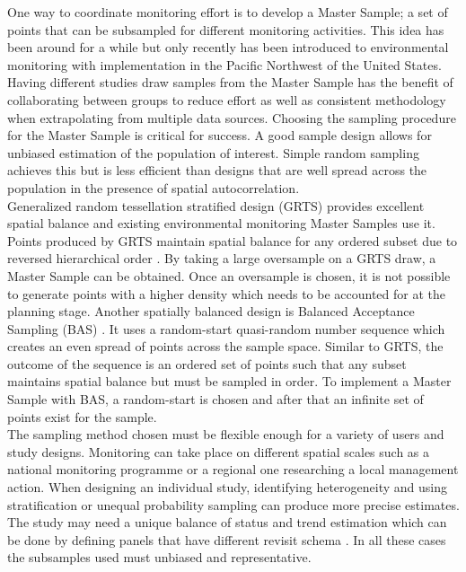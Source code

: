 \documentclass[]{article}
\begin{document}
One way to coordinate monitoring effort is to develop a Master Sample; a set of points that can be subsampled for different monitoring activities. This idea has been around for a while \cite{King1945} but only recently has been introduced to environmental monitoring \cite{LarsenOlsenStevens2008} with implementation in the Pacific Northwest of the United States. Having different studies draw samples from the Master Sample has the benefit of collaborating between groups to reduce effort as well as consistent methodology when extrapolating from multiple data sources. Choosing the sampling procedure for the Master Sample is critical for success. A good sample design allows for unbiased estimation of the population of interest. Simple random sampling achieves this but is less efficient than designs that are well spread across the population in the presence of spatial autocorrelation.\\

Generalized random tessellation stratified design (GRTS) \cite{StevensOlsen2004} provides excellent spatial balance and existing environmental monitoring Master Samples \cite{LarsenOlsenStevens2008} use it. Points produced by GRTS maintain spatial balance for any ordered subset due to reversed hierarchical order \cite{StevensOlsen2004}. By taking a large oversample on a GRTS draw, a Master Sample can be obtained. Once an oversample is chosen, it is not possible to generate points with a higher density which needs to be accounted for at the planning stage. Another spatially balanced design is Balanced Acceptance Sampling (BAS) \cite{Robertson2013}. It uses a random-start quasi-random number sequence which creates an even spread of points across the sample space. Similar to GRTS, the outcome of the sequence is an ordered set of points such that any subset maintains spatial balance but must be sampled in order. To implement a Master Sample with BAS, a random-start is chosen and after that an infinite set of points exist for the sample.\\

The sampling method chosen must be flexible enough for a variety of users and study designs. Monitoring can take place on different spatial scales such as a national monitoring programme or a regional one researching a local management action. When designing an individual study, identifying heterogeneity and using stratification \cite{Yoccoz2001} or unequal probability sampling \cite{Stevens1997} can produce more precise estimates. The study may need a unique balance of status and trend estimation which can be done by defining panels that have different revisit schema \cite{Skalski1990, Mcdonald2003, StevensOlsen1999}. In all these cases the subsamples used must unbiased and representative.\\
\end{document}
